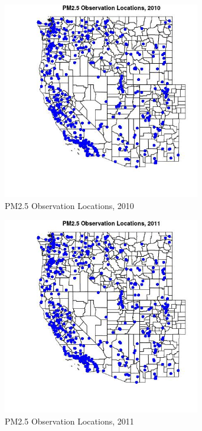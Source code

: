 \begin{figure} 
\centering  
\includegraphics[width=0.77\textwidth]{Code_Outputs/Report_PM25_Step4_part_e_de_duplicated_aves_prioritize_24hr_obs_ML_input_PlotLoc2010.jpg} 
\caption{\label{fig:Report_PM25_Step4_part_e_de_duplicated_aves_prioritize_24hr_obs_ML_inputPlotLoc2010}PM2.5 Observation Locations, 2010} 
\end{figure} 
 

\begin{figure} 
\centering  
\includegraphics[width=0.77\textwidth]{Code_Outputs/Report_PM25_Step4_part_e_de_duplicated_aves_prioritize_24hr_obs_ML_input_PlotLoc2011.jpg} 
\caption{\label{fig:Report_PM25_Step4_part_e_de_duplicated_aves_prioritize_24hr_obs_ML_inputPlotLoc2011}PM2.5 Observation Locations, 2011} 
\end{figure} 
 

